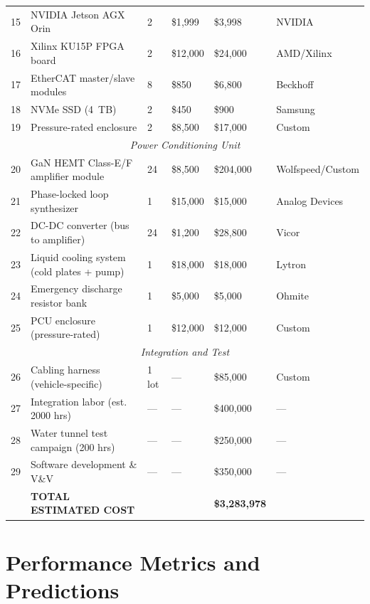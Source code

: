 \documentclass[11pt]{article}
\begin{document}
\begin{longtable}{@{}p{0.5cm}p{5cm}p{1.5cm}p{2cm}p{2cm}p{2.5cm}@{}}
\midrule
15 & NVIDIA Jetson AGX Orin & 2
& \$1{,}999 & \$3{,}998 & NVIDIA \\
16 & Xilinx KU15P FPGA board & 2
& \$12{,}000 & \$24{,}000 & AMD/Xilinx \\
17 & EtherCAT master/slave modules & 8
& \$850 & \$6{,}800 & Beckhoff \\
18 & NVMe SSD (4~TB) & 2
& \$450 & \$900 & Samsung \\
19 & Pressure-rated enclosure & 2
& \$8{,}500 & \$17{,}000 & Custom \\
\midrule
\multicolumn{6}{c}{\textit{Power Conditioning Unit}} \\
\midrule
20 & GaN HEMT Class-E/F amplifier module & 24
& \$8{,}500 & \$204{,}000 & Wolfspeed/Custom \\
21 & Phase-locked loop synthesizer & 1
& \$15{,}000 & \$15{,}000 & Analog Devices \\
22 & DC-DC converter (bus to amplifier) & 24
& \$1{,}200 & \$28{,}800 & Vicor \\
23 & Liquid cooling system (cold plates + pump) & 1
& \$18{,}000 & \$18{,}000 & Lytron \\
24 & Emergency discharge resistor bank & 1
& \$5{,}000 & \$5{,}000 & Ohmite \\
25 & PCU enclosure (pressure-rated) & 1
& \$12{,}000 & \$12{,}000 & Custom \\
\midrule
\multicolumn{6}{c}{\textit{Integration and Test}} \\
\midrule
26 & Cabling harness (vehicle-specific) & 1 lot
& --- & \$85{,}000 & Custom \\
27 & Integration labor (est. 2000 hrs) & ---
& --- & \$400{,}000 & --- \\
28 & Water tunnel test campaign (200 hrs) & ---
& --- & \$250{,}000 & --- \\
29 & Software development \& V\&V & ---
& --- & \$350{,}000 & --- \\
\midrule
\midrule
& \textbf{TOTAL ESTIMATED COST} & & & \textbf{\$3{,}283{,}978} & \\
\bottomrule
\end{longtable}

\section{Performance Metrics and Predictions}
\label{sec:performance}
\end{document}
